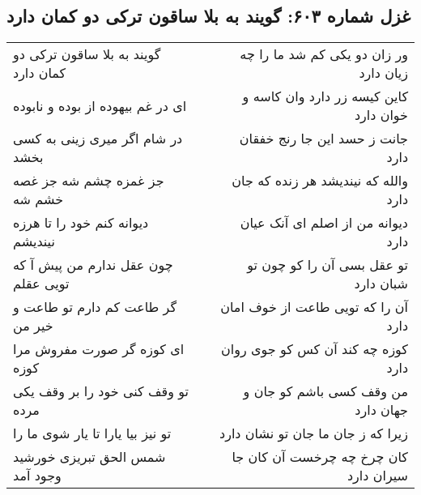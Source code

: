 \begin{center}
\section*{غزل شماره ۶۰۳: گویند به بلا ساقون ترکی دو کمان دارد}
\label{sec:0603}
\begin{longtable}{l p{0.5cm} r}
گویند به بلا ساقون ترکی دو کمان دارد
&&
ور زان دو یکی کم شد ما را چه زیان دارد
\\
ای در غم بیهوده از بوده و نابوده
&&
کاین کیسه زر دارد وان کاسه و خوان دارد
\\
در شام اگر میری زینی به کسی بخشد
&&
جانت ز حسد این جا رنج خفقان دارد
\\
جز غمزه چشم شه جز غصه خشم شه
&&
والله که نیندیشد هر زنده که جان دارد
\\
دیوانه کنم خود را تا هرزه نیندیشم
&&
دیوانه من از اصلم ای آنک عیان دارد
\\
چون عقل ندارم من پیش آ که تویی عقلم
&&
تو عقل بسی آن را کو چون تو شبان دارد
\\
گر طاعت کم دارم تو طاعت و خیر من
&&
آن را که تویی طاعت از خوف امان دارد
\\
ای کوزه گر صورت مفروش مرا کوزه
&&
کوزه چه کند آن کس کو جوی روان دارد
\\
تو وقف کنی خود را بر وقف یکی مرده
&&
من وقف کسی باشم کو جان و جهان دارد
\\
تو نیز بیا یارا تا یار شوی ما را
&&
زیرا که ز جان ما جان تو نشان دارد
\\
شمس الحق تبریزی خورشید وجود آمد
&&
کان چرخ چه چرخست آن کان جا سیران دارد
\\
\end{longtable}
\end{center}

